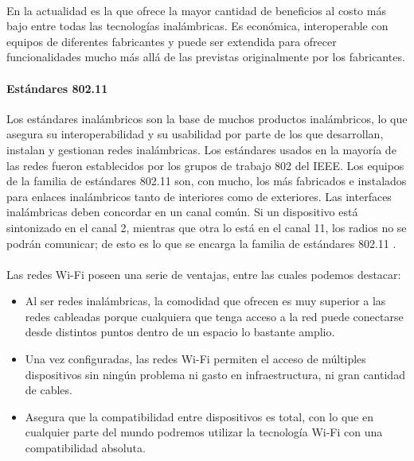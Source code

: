  \paragraph{}
 En la actualidad es la que ofrece la mayor cantidad de beneficios al costo más bajo entre todas las tecnologías inalámbricas. Es económica, interoperable con equipos de diferentes fabricantes y puede ser extendida para ofrecer funcionalidades mucho más allá de las previstas originalmente por los fabricantes.
 
 \paragraph{Estándares 802.11}Los estándares inalámbricos son la base de muchos productos inalámbricos, lo que asegura su interoperabilidad y su usabilidad por parte de los que desarrollan, instalan y gestionan redes inalámbricas. Los estándares usados en la mayoría de las redes fueron establecidos por los grupos de trabajo 802 del IEEE. Los equipos de la familia de estándares 802.11 son, con mucho, los más fabricados e instalados para enlaces inalámbricos tanto de interiores como de exteriores. Las interfaces inalámbricas deben concordar en un canal común. Si un dispositivo está sintonizado en el canal 2, mientras que otra lo está en el canal 11, los radios no se podrán comunicar; de esto es lo que se encarga la familia de estándares 802.11 \citep{MarcoTeoricoWifi}.
\paragraph{}
Las redes Wi-Fi poseen una serie de ventajas, entre las cuales podemos destacar:
\begin{itemize}
	\item Al ser redes inalámbricas, la comodidad que ofrecen es muy superior a las redes cableadas porque cualquiera que tenga acceso a la red puede conectarse desde distintos puntos dentro de un espacio lo bastante amplio.
    \item Una vez configuradas, las redes Wi-Fi permiten el acceso de múltiples dispositivos sin ningún problema ni gasto en infraestructura, ni gran cantidad de cables.
    \item Asegura que la compatibilidad entre dispositivos es total, con lo que en cualquier parte del mundo podremos utilizar la tecnología Wi-Fi con una compatibilidad absoluta. 
\end{itemize}
 
 
 
